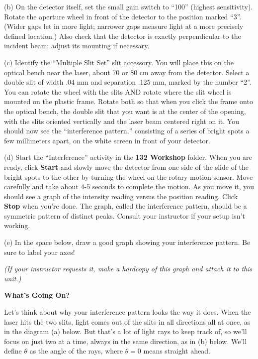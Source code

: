 
(b) On the detector itself, set the small gain switch to ``100'' (highest sensitivity).  Rotate the aperture wheel in front of the detector to the position marked ``3''.  (Wider gaps let in more light; narrower gaps measure light at a more precisely defined location.)  Also check that the detector is exactly perpendicular to the incident beam; adjust its mounting if necessary.


(c) Identify the ``Multiple Slit Set'' slit accessory.  You will place this on the optical bench near the laser, about 70 or 80 cm away from the detector.  Select a double slit of width .04 mm and separation .125 mm, marked by the number ``2''. You can rotate the wheel with the slits AND rotate where the slit wheel is mounted on the plastic frame.  
Rotate both so that when you click the frame onto the optical bench, the double slit that you want is at the center of the opening, with the slits oriented vertically and the laser beam centered right on it.  You should now see the ``interference pattern,'' consisting of a series of bright spots a few millimeters apart, on the white screen in front of your detector.


(d) Start the ``Interference'' activity in the {\bf 132 Workshop} folder. 
When you are ready, click {\bf Start} and slowly move the detector 
from one side of the slide of the bright spots to the other by turning the wheel on the rotary 
motion sensor. Move carefully and take about 4-5 seconds to complete the 
motion. 
As you move it, you should see a graph of the intensity reading versus the position reading. 
Click {\bf Stop} when you're done. 
The graph, called the interference pattern, should be a symmetric pattern of distinct peaks. Consult your instructor if your setup isn't working.

\pagebreak[2]
(e) In the space below, draw a good graph showing your interference pattern.  
Be sure to label your axes!
\answerspace{1.5in}

\textit{(If your instructor requests it, make a hardcopy of this graph and attach it to this unit.)}

\textbf{What's Going On?}

Let's think about why your interference pattern looks the way it does.  When the laser hits the two slits, 
light comes out of the slits in all directions all at once, as in the diagram (a) below.  
But that's a lot of light rays to keep track of, so we'll focus on just two at a time, always in the same direction, as in (b) below.
We'll define $\theta$ as the angle of the rays, where $\theta=0$ means straight ahead.  

